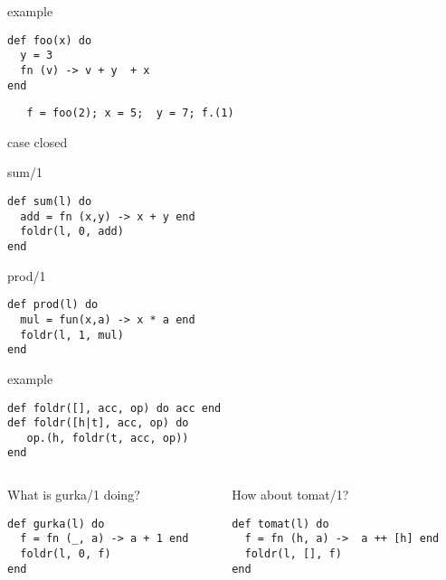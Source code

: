 \begin{frame}[fragile]{example}

\begin{verbatim}
def foo(x) do
  y = 3
  fn (v) -> v + y  + x 
end
\end{verbatim}
\pause\vspace{20pt}

\begin{verbatim}
   f = foo(2); x = 5;  y = 7; f.(1)
\end{verbatim}
\end{frame}

\begin{frame}[fragile]{case closed}

\pause
     \begin{block}{sum/1}
       \begin{verbatim}
def sum(l) do
  add = fn (x,y) -> x + y end
  foldr(l, 0, add)
end
       \end{verbatim}
     \end{block}
   \pause
     \begin{block}{prod/1}
       \begin{verbatim}
def prod(l) do
  mul = fun(x,a) -> x * a end
  foldr(l, 1, mul)
end
       \end{verbatim}
\vfill
     \end{block}

\end{frame}

\begin{frame}[fragile]{example}

\begin{verbatim}
def foldr([], acc, op) do acc end
def foldr([h|t], acc, op) do
   op.(h, foldr(t, acc, op))
end
\end{verbatim}
  
\pause\vspace{20pt}

\begin{columns}
  \begin{column}{.5\linewidth}
What is gurka/1 doing?
\begin{verbatim}
def gurka(l) do
  f = fn (_, a) -> a + 1 end
  foldr(l, 0, f)
end
\end{verbatim}
  \end{column}
  \pause
  \begin{column}{.5\linewidth}
How about tomat/1?
\begin{verbatim}
def tomat(l) do 
  f = fn (h, a) ->  a ++ [h] end
  foldr(l, [], f)
end
\end{verbatim}
\end{column}
\end{columns}

\end{frame}

